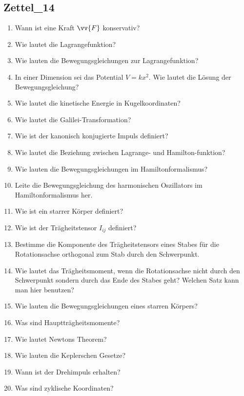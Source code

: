 \documentclass[a4paper,12pt]{article}
\numberwithin{equation}{section}
\begin{document}
\newpage
\subsection{Zettel\_14}
\begin{enumerate}[label=\arabic*.]
        \item Wann ist eine Kraft $\vv{F}$ konservativ?
        \item Wie lautet die Lagrangefunktion?
        \item Wie lauten die Bewegungsgleichungen zur Lagrangefunktion?
        \item In einer Dimension sei das Potential $V=kx^2$. Wie lautet die Lösung der Bewegungsgleichung?
        \item Wie lautet die kinetische Energie in Kugelkoordinaten?
        \item Wie lautet die Galilei-Transformation?
        \item Wie ist der kanonisch konjugierte Impuls definiert?
        \item Wie lautet die Beziehung zwischen Lagrange- und Hamilton-funktion?
        \item Wie lauten die Bewegungsgleichungen im Hamiltonformalismus?
        \item Leite die Bewegungsgleichung des harmonischen Oszillators im Hamiltonformalismus her.
        \item Wie ist ein starrer Körper definiert?
        \item Wie ist der Trägheitstensor $I_{ij}$ definiert?
        \item Bestimme die Komponente des Trägheitstensors eines Stabes für die Rotationsachse orthogonal zum Stab durch den Schwerpunkt.
        \item Wie lautet das Trägheitsmoment, wenn die Rotationsachse nicht durch den Schwerpunkt sondern durch das Ende des Stabes geht? Welchen Satz kann man hier benutzen?
        \item Wie lauten die Bewegungsgleichungen eines starren Körpers?
        \item Was sind Hauptträgheitsmomente?
        \item Wie lautet Newtons Theorem?
        \item Wie lauten die Keplerschen Gesetze?
        \item Wann ist der Drehimpuls erhalten?
        \item Was sind zyklische Koordinaten?
\end{enumerate}
\end{document}
